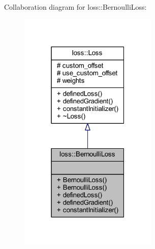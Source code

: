 Collaboration diagram for loss\+:\+:Bernoulli\+Loss\+:\nopagebreak
\begin{figure}[H]
\begin{center}
\leavevmode
\includegraphics[width=187pt]{classloss_1_1_bernoulli_loss__coll__graph}
\end{center}
\end{figure}
